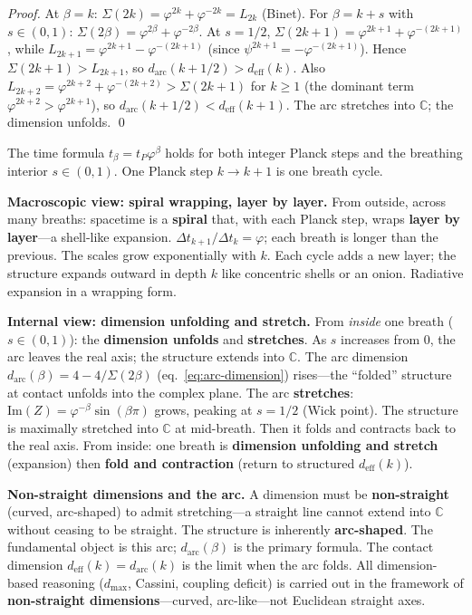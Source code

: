 \documentclass[12pt,a4paper]{article}
\begin{document}
\begin{proof}
At $\beta = k$: $\Sigma(2k) = \varphi^{2k} + \varphi^{-2k} = L_{2k}$ (Binet). For $\beta = k + s$ with $s \in (0,1)$: $\Sigma(2\beta) = \varphi^{2\beta} + \varphi^{-2\beta}$. At $s = 1/2$, $\Sigma(2k+1) = \varphi^{2k+1} + \varphi^{-(2k+1)}$, while $L_{2k+1} = \varphi^{2k+1} - \varphi^{-(2k+1)}$ (since $\psi^{2k+1} = -\varphi^{-(2k+1)}$). Hence $\Sigma(2k+1) > L_{2k+1}$, so $d_{\mathrm{arc}}(k+1/2) > d_{\mathrm{eff}}(k)$. Also $L_{2k+2} = \varphi^{2k+2} + \varphi^{-(2k+2)} > \Sigma(2k+1)$ for $k \geq 1$ (the dominant term $\varphi^{2k+2} > \varphi^{2k+1}$), so $d_{\mathrm{arc}}(k+1/2) < d_{\mathrm{eff}}(k+1)$. The arc stretches into $\mathbb{C}$; the dimension unfolds. \qed
\end{proof}

\noindent The time formula $t_\beta = t_P\varphi^\beta$ holds for both integer Planck steps and the breathing interior $s \in (0,1)$. One Planck step $k \to k+1$ is one breath cycle.

\medskip
\noindent\textbf{Macroscopic view: spiral wrapping, layer by layer.} From outside, across many breaths: spacetime is a \textbf{spiral} that, with each Planck step, wraps \textbf{layer by layer}---a shell-like expansion. $\Delta t_{k+1}/\Delta t_k = \varphi$; each breath is longer than the previous. The scales grow exponentially with $k$. Each cycle adds a new layer; the structure expands outward in depth $k$ like concentric shells or an onion. Radiative expansion in a wrapping form.

\medskip
\noindent\textbf{Internal view: dimension unfolding and stretch.} From \emph{inside} one breath ($s \in (0,1)$): the \textbf{dimension unfolds} and \textbf{stretches}. As $s$ increases from $0$, the arc leaves the real axis; the structure extends into $\mathbb{C}$. The arc dimension $d_{\mathrm{arc}}(\beta) = 4 - 4/\Sigma(2\beta)$ (eq.~\ref{eq:arc-dimension}) rises---the ``folded'' structure at contact unfolds into the complex plane. The arc \textbf{stretches}: $\mathrm{Im}(Z) = \varphi^{-\beta}\sin(\beta\pi)$ grows, peaking at $s = 1/2$ (Wick point). The structure is maximally stretched into $\mathbb{C}$ at mid-breath. Then it folds and contracts back to the real axis. From inside: one breath is \textbf{dimension unfolding and stretch} (expansion) then \textbf{fold and contraction} (return to structured $d_{\mathrm{eff}}(k)$).

\medskip
\noindent\textbf{Non-straight dimensions and the arc.} A dimension must be \textbf{non-straight} (curved, arc-shaped) to admit stretching---a straight line cannot extend into $\mathbb{C}$ without ceasing to be straight. The structure is inherently \textbf{arc-shaped}. The fundamental object is this arc; $d_{\mathrm{arc}}(\beta)$ is the primary formula. The contact dimension $d_{\mathrm{eff}}(k) = d_{\mathrm{arc}}(k)$ is the limit when the arc folds. All dimension-based reasoning ($d_{\max}$, Cassini, coupling deficit) is carried out in the framework of \textbf{non-straight dimensions}---curved, arc-like---not Euclidean straight axes.
\end{document}
